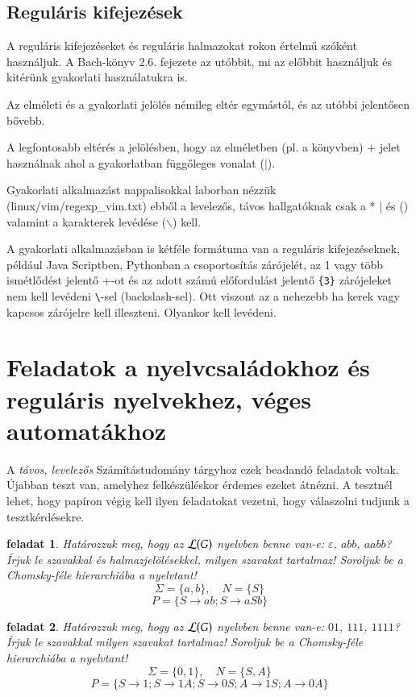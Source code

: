 \documentclass[a4paper]{article}
\newtheorem{feladat}{feladat}[section]
\begin{document}
\subsection{Reguláris kifejezések}
A reguláris kifejezéseket és reguláris halmazokat rokon értelmű szóként
használjuk. A Bach-könyv 2.6. fejezete az utóbbit, mi az előbbit
használjuk és kitérünk gyakorlati használatukra is.

Az elméleti és a gyakorlati jelölés némileg eltér egymástól, és az
utóbbi jelentősen bővebb.

A legfontosabb eltérés a jelölésben, hogy az elméletben (pl. a könyvben)
+ jelet használnak ahol a gyakorlatban függőleges vonalat ($\mid$).

Gyakorlati alkalmazást nappalisokkal laborban nézzük
(linux/vim/regexp\_vim.txt) ebből a levelezős, távos hallgatóknak csak a
* | és () valamint a karakterek levédése ($\backslash$) kell.

A gyakorlati alkalmazásban is kétféle formátuma van a reguláris
kifejezéseknek, például Java Scriptben, Pythonban a csoportosítás
zárójelét, az 1 vagy több ismétlődést jelentő +-ot és az adott számú
előfordulást jelentő \verb|{3}| zárójeleket
nem kell levédeni \verb|\|-sel (backslash-sel). Ott viszont az a
nehezebb ha kerek vagy kapcsos zárójelre kell illeszteni.  Olyankor kell
levédeni.

\section{Feladatok a nyelvcsaládokhoz és reguláris nyelvekhez, véges
automatákhoz}

A \emph{távos, levelezős} Számítástudomány tárgyhoz ezek beadandó feladatok
voltak. Újabban teszt van, amelyhez felkészüléskor érdemes ezeket
átnézni. A tesztnél lehet, hogy papíron végig kell ilyen feladatokat
vezetni, hogy válaszolni tudjunk a tesztkérdésekre.

\begin{feladat}
Határozzuk meg, hogy az ${\cal L}(G)$ nyelvben benne
van-e: $\varepsilon$, $abb$, $aabb$? Írjuk le szavakkal és
halmazjelölésekkel, milyen szavakat tartalmaz! Soroljuk be a
Chomsky-féle hierarchiába a nyelvtant!
\[\Sigma=\{a, b\},\quad N=\{S\}\] \[P=\{S\rightarrow ab;
S\rightarrow aSb\}\]
\end{feladat}

\begin{feladat}
Határozzuk meg, hogy az ${\cal L}(G)$ nyelvben benne van-e: $01$, $111$,
$1111$? Írjuk le szavakkal milyen szavakat tartalmaz! Soroljuk be a
Chomsky-féle hierarchiába a nyelvtant!
\[\Sigma=\{0, 1\},\quad N=\{S, A\}\] \[P=\{S\rightarrow 1; S\rightarrow
1A; S\rightarrow 0S; A\rightarrow 1S; A\rightarrow 0A\}\]
\end{feladat}
\end{document}
